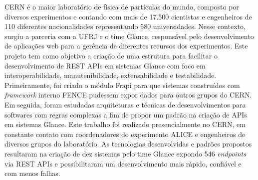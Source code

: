 \begin{foreignabstract}

CERN é o maior laboratório de física de partículas do mundo, composto por diversos experimentos e contando com mais de 17.500 cientistas e engenheiros de 110 diferentes nacionalidades representando 580 universidades. Nesse contexto, surgiu a parceria com a UFRJ e o time Glance, responsável pelo desenvolvimento de aplicações web para a gerência de diferentes recursos dos experimentos. Este projeto tem como objetivo a criação de uma estrutura para facilitar o desenvolvimento de REST APIs em sistemas Glance com foco em interoperabilidade, manutenibilidade, extensabilidade e testabilidade. Primeiramente, foi criado o módulo Frapi para que sistemas construídos com \textit{framework} interno FENCE pudessem expor dados para outros grupos do CERN. Em seguida, foram estudadas arquiteturas e técnicas de desenvolvimentos para softwares com regras complexas a fim de propor um padrão na criação de APIs em sistemas Glance.
Este trabalho foi realizado presencialmente no CERN, em constante contato com coordenadores do experimento ALICE e engenheiros de diversos grupos do laboratório. As tecnologias desenvolvidas e padrões propostos resultaram na criação de dez sistemas pelo time Glance expondo 546 \textit{endpoints} via REST APIs e possibilitaram um desenvolvimento mais rápido, confiável e com menos falhas.

\end{foreignabstract}

